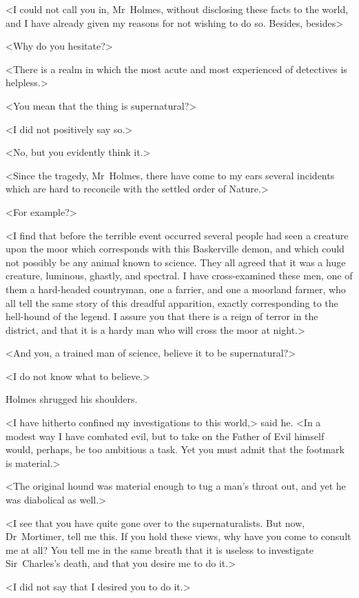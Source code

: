 <I could not call you in, Mr~Holmes, without disclosing these facts to the world, and I have already given my reasons for not wishing to do so. Besides, besides\longdash>

<Why do you hesitate?>

<There is a realm in which the most acute and most experienced of detectives is helpless.>

<You mean that the thing is supernatural?>

<I did not positively say so.>

<No, but you evidently think it.>

<Since the tragedy, Mr~Holmes, there have come to my ears several incidents which are hard to reconcile with the settled order of Nature.>

<For example?>

<I find that before the terrible event occurred several people had seen a creature upon the moor which corresponds with this Baskerville demon, and which could not possibly be any animal known to science. They all agreed that it was a huge creature, luminous, ghastly, and spectral. I have cross-examined these men, one of them a hard-headed countryman, one a farrier, and one a moorland farmer, who all tell the same story of this dreadful apparition, exactly corresponding to the hell-hound of the legend. I assure you that there is a reign of terror in the district, and that it is a hardy man who will cross the moor at night.>

<And you, a trained man of science, believe it to be supernatural?>

<I do not know what to believe.>

Holmes shrugged his shoulders.

<I have hitherto confined my investigations to this world,> said he. <In a modest way I have combated evil, but to take on the Father of Evil himself would, perhaps, be too ambitious a task. Yet you must admit that the footmark is material.>

<The original hound was material enough to tug a man's throat out, and yet he was diabolical as well.>

<I see that you have quite gone over to the supernaturalists. But now, Dr~Mortimer, tell me this. If you hold these views, why have you come to consult me at all? You tell me in the same breath that it is useless to investigate Sir~Charles's death, and that you desire me to do it.>

<I did not say that I desired you to do it.>

